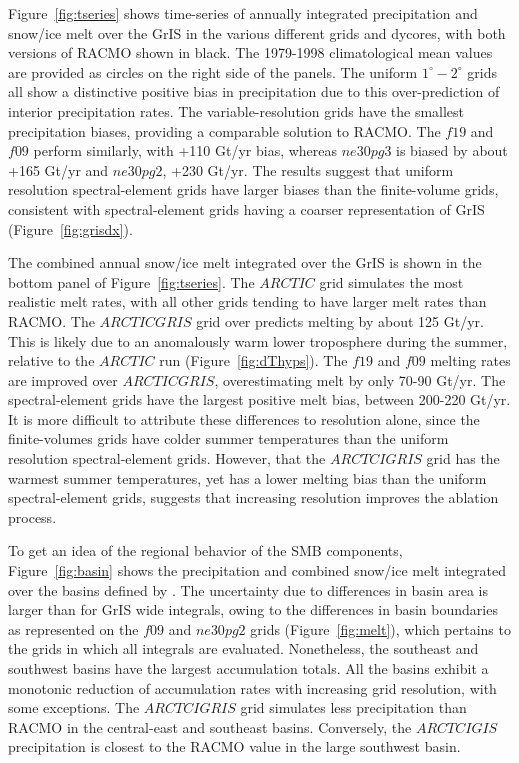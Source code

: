 \documentclass[draft]{agujournal2019}
\begin{document}
Figure~\ref{fig:tseries} shows time-series of annually integrated precipitation and snow/ice melt over the GrIS in the various different grids and dycores, with both versions of RACMO shown in black. The 1979-1998 climatological mean values are provided as circles on the right side of the panels. The uniform $1^{\circ}-2^{\circ}$ grids all show a distinctive positive bias in precipitation due to this over-prediction of interior precipitation rates. The  variable-resolution grids have the smallest precipitation biases, providing a comparable solution to RACMO. The $f19$ and $f09$ perform similarly, with +110 Gt/yr bias, whereas $ne30pg3$ is biased by about +165 Gt/yr and $ne30pg2$, +230 Gt/yr. The results suggest that uniform resolution spectral-element grids have larger biases than the finite-volume grids, consistent with spectral-element grids having a coarser representation of GrIS (Figure~\ref{fig:grisdx}).

The combined annual snow/ice melt integrated over the GrIS is shown in the bottom panel of Figure~\ref{fig:tseries}. The $ARCTIC$ grid simulates the most realistic melt rates, with all other grids tending to have larger melt rates than RACMO. The $ARCTICGRIS$ grid over predicts melting by about 125 Gt/yr. This is likely due to an anomalously warm lower troposphere during the summer, relative to the $ARCTIC$ run (Figure~\ref{fig:dThyps}). The $f19$ and $f09$ melting rates are improved over $ARCTICGRIS$, overestimating melt by only 70-90 Gt/yr. The spectral-element grids have the largest positive melt bias, between 200-220 Gt/yr. It is more difficult to attribute these differences to resolution alone, since the finite-volumes grids have colder summer temperatures than the uniform resolution spectral-element grids. However, that the $ARCTCIGRIS$ grid has the warmest summer temperatures, yet has a lower melting bias than the uniform spectral-element grids, suggests that increasing resolution improves the ablation process.

To get an idea of the regional behavior of the SMB components, Figure~\ref{fig:basin} shows the precipitation and combined snow/ice melt integrated over the basins defined by \cite{RM2012GRL}. The uncertainty due to differences in basin area is larger than for GrIS wide integrals, owing to the differences in basin boundaries as represented on the $f09$ and $ne30pg2$ grids (Figure~\ref{fig:melt}), which pertains to the grids in which all integrals are evaluated. Nonetheless, the southeast and southwest basins have the largest accumulation totals. All the basins exhibit a monotonic reduction of accumulation rates with increasing grid resolution, with some exceptions. The $ARCTCIGRIS$ grid simulates less precipitation than RACMO in the central-east and southeast basins. Conversely, the $ARCTCIGIS$ precipitation is closest to the RACMO value in the large southwest basin.
\end{document}
